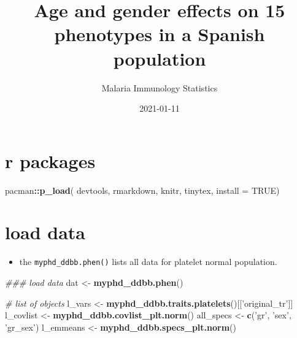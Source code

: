 \documentclass[
  10pt,
]{article}
\title{Age and gender effects on 15 phenotypes in a Spanish population}
\author{Malaria Immunology Statistics}
\date{2021-01-11}
\newenvironment{Shaded}{\begin{snugshade}}{\end{snugshade}}
\newcommand{\CommentTok}[1]{\textcolor[rgb]{0.56,0.35,0.01}{\textit{#1}}}
\newcommand{\DataTypeTok}[1]{\textcolor[rgb]{0.13,0.29,0.53}{#1}}
\newcommand{\KeywordTok}[1]{\textcolor[rgb]{0.13,0.29,0.53}{\textbf{#1}}}
\newcommand{\NormalTok}[1]{#1}
\newcommand{\OperatorTok}[1]{\textcolor[rgb]{0.81,0.36,0.00}{\textbf{#1}}}
\newcommand{\OtherTok}[1]{\textcolor[rgb]{0.56,0.35,0.01}{#1}}
\newcommand{\StringTok}[1]{\textcolor[rgb]{0.31,0.60,0.02}{#1}}
\providecommand{\tightlist}{%
  \setlength{\itemsep}{0pt}\setlength{\parskip}{0pt}}
\begin{document}
\maketitle

{
\setcounter{tocdepth}{2}
\tableofcontents
}
\newpage

\hypertarget{r-packages}{%
\section{r packages}\label{r-packages}}

\begin{Shaded}
\begin{Highlighting}[]
\NormalTok{pacman}\OperatorTok{::}\KeywordTok{p_load}\NormalTok{(}
\NormalTok{  devtools, rmarkdown,}
\NormalTok{  knitr, tinytex, }\DataTypeTok{install =} \OtherTok{TRUE}\NormalTok{)}
\end{Highlighting}
\end{Shaded}

\newpage

\hypertarget{load-data}{%
\section{load data}\label{load-data}}

\begin{itemize}
\tightlist
\item
  the \texttt{myphd\_ddbb.phen()} lists all data for platelet normal
  population. \newline
\end{itemize}

\begin{Shaded}
\begin{Highlighting}[]
\CommentTok{### load data}
\NormalTok{    dat <-}\StringTok{ }\KeywordTok{myphd_ddbb.phen}\NormalTok{()}


    \CommentTok{# list of objects}
\NormalTok{        l_vars <-}\StringTok{ }\KeywordTok{myphd_ddbb.traits.platelets}\NormalTok{()[[}\StringTok{'original_tr'}\NormalTok{]]}
\NormalTok{        l_covlist <-}\StringTok{ }\KeywordTok{myphd_ddbb.covlist_plt.norm}\NormalTok{()}
\NormalTok{        all_specs <-}\StringTok{ }\KeywordTok{c}\NormalTok{(}\StringTok{'gr'}\NormalTok{, }\StringTok{'sex'}\NormalTok{, }\StringTok{'gr_sex'}\NormalTok{)       }
\NormalTok{        l_emmeans <-}\StringTok{ }\KeywordTok{myphd_ddbb.specs_plt.norm}\NormalTok{()}
\end{Highlighting}
\end{Shaded}
\end{document}
